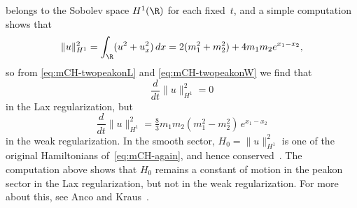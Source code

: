 \documentclass[10pt,a4paper]{article} \pdfoutput=1 
\begin{document}
belongs to the Sobolev space $H^1(\R)$ for each fixed~$t$,
and a simple computation shows that
\begin{equation}
  \lVert u \rVert^2_{H^1}
  = \int_{\R} (u^2 + u_x^2) \, dx
  = 2 (m_1^2+m_2^2) + 4 m_1m_2 e^{x_1-x_2}
  ,
\end{equation}
so from \eqref{eq:mCH-twopeakonL} and \eqref{eq:mCH-twopeakonW} we find that
\begin{equation}
  \frac{d}{dt} \lVert u \rVert^2_{H^1} = 0
\end{equation}
in the Lax regularization,
but
\begin{equation}
  \frac{d}{dt} \lVert u \rVert^2_{H^1}
  = \tfrac83 m_1 m_2 (m_1^2 - m_2^2) \, e^{x_1 - x_2}
\end{equation}
in the weak regularization.
In the smooth sector,
$H_0 = \lVert u \rVert^2_{H^1}$
is one of the original Hamiltonians of~\eqref{eq:mCH-again},
and hence conserved~\cite{qiao:2006:mCH-new-integrable-cuspons-WMpeakons}.
The computation above shows that $H_0$ remains a constant of motion in the peakon sector
in the Lax regularization,
but not in the weak regularization.
For more about this, see Anco and Kraus~\cite{anco-kraus:2018:hamiltonian-peakons-weak-solution-mCH}.
\end{document}
